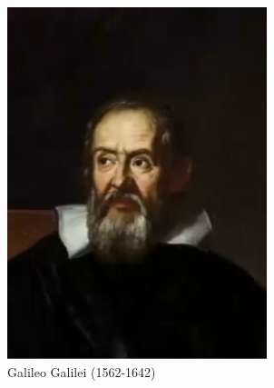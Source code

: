\documentclass[../summary.tex]{subfiles}
\begin{document}
	\begin{figure} [htbp]
		\centering
		\begin{subfigure}{0.3\linewidth}
			\centering
			\includegraphics[width=\linewidth]{images/2-galilei.png}
			\caption{Galileo Galilei (1562-1642)}
			\label{fig:galilei}
		\end{subfigure}
		\begin{subfigure}{0.3\linewidth}
			\centering

\end{subfigure}
\end{figure}
\end{document}
